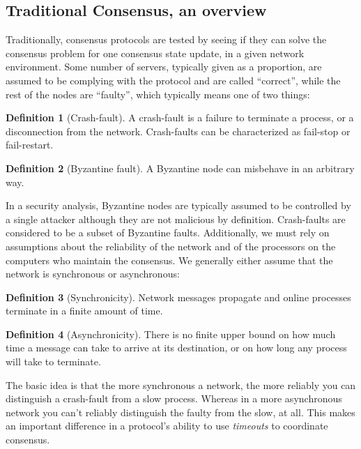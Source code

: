 \documentclass[11pt,a4paper]{article}
\theoremstyle{plain}
\theoremstyle{definition}
\newtheorem{defn}{Definition}
\begin{document}
\subsection{Traditional Consensus, an overview}

Traditionally, consensus protocols are tested by seeing if they can solve the consensus problem for one consensus state update, in a given network environment. Some number of servers, typically given as a proportion, are assumed to be complying with the protocol and are called ``correct'', while the rest of the nodes are ``faulty'', which typically means one of two things:

\begin{defn}[Crash-fault]
A crash-fault is a failure to terminate a process, or a disconnection from the network. Crash-faults can be characterized as fail-stop or fail-restart.
\end{defn}

\begin{defn}[Byzantine fault]
A Byzantine node can misbehave in an arbitrary way. 
\end{defn}

In a security analysis, Byzantine nodes are typically assumed to be controlled by a single attacker although they are not malicious by definition. Crash-faults are considered to be a subset of Byzantine faults. Additionally, we must rely on assumptions about the reliability of the network and of the processors on the computers who maintain the consensus. We generally either assume that the network is synchronous or asynchronous: 

\begin{defn}[Synchronicity]
Network messages propagate and online processes terminate in a finite amount of time.
\end{defn}

\begin{defn}[Asynchronicity]
There is no finite upper bound on how much time a message can take to arrive at its destination, or on how long any process will take to terminate. 
\end{defn}

The basic idea is that the more synchronous a network, the more reliably you can distinguish a crash-fault from a slow process. Whereas in a more asynchronous network you can't reliably distinguish the faulty from the slow, at all. This makes an important difference in a protocol's ability to use \emph{timeouts} to coordinate consensus. 
\end{document}
